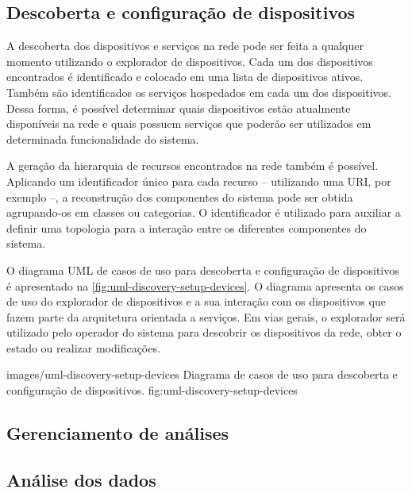 \subsection{Descoberta e configuração de dispositivos}

A descoberta dos dispositivos e serviços na rede pode ser feita a qualquer momento utilizando o
explorador de dispositivos. Cada um dos dispositivos encontrados é identificado e colocado em uma
lista de dispositivos ativos. Também são identificados os serviços hospedados em cada um dos
dispositivos. Dessa forma, é possível determinar quais dispositivos estão atualmente disponíveis na
rede e quais possuem serviços que poderão ser utilizados em determinada funcionalidade do sistema.

A geração da hierarquia de recursos encontrados na rede também é possível. Aplicando um
identificador único para cada recurso -- utilizando uma \gls{URI}, por exemplo --, a reconstrução
dos componentes do sistema pode ser obtida agrupando-os em classes ou categorias. O identificador é
utilizado para auxiliar a definir uma topologia para a interação entre os diferentes componentes do
sistema.

O diagrama \gls{UML} de casos de uso para descoberta e configuração de dispositivos é apresentado na
\cref{fig:uml-discovery-setup-devices}. O diagrama apresenta os casos de uso do explorador de
dispositivos e a sua interação com os dispositivos que fazem parte da arquitetura orientada a
serviços. Em vias gerais, o explorador será utilizado pelo operador do sistema para descobrir os
dispositivos da rede, obter o estado ou realizar modificações.

    {images/uml-discovery-setup-devices}
    {Diagrama de casos de uso para descoberta e configuração de dispositivos.}
    {fig:uml-discovery-setup-devices}




\subsection{Gerenciamento de análises}


\subsection{Análise dos dados}

